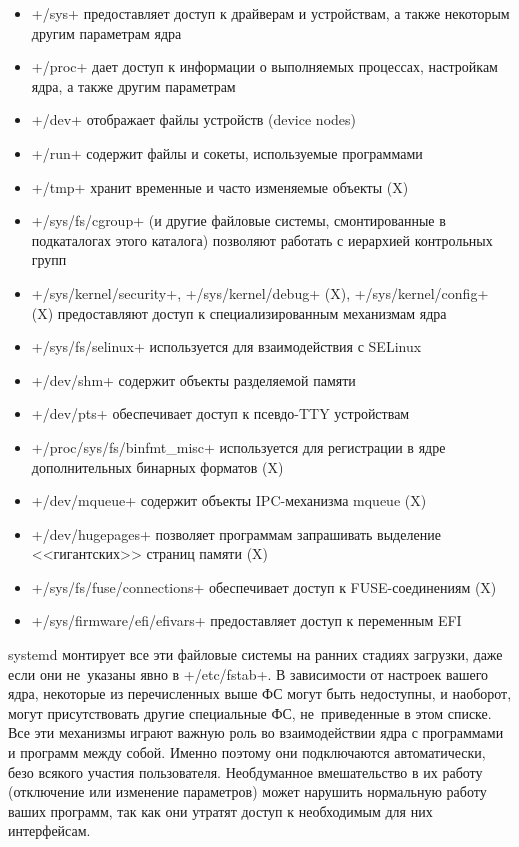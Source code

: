 \documentclass[10pt,oneside,a4paper]{article}
\begin{document}
\begin{itemize}
	\item +/sys+ предоставляет доступ к драйверам и устройствам, а также
		некоторым другим параметрам ядра
	\item +/proc+ дает доступ к информации о выполняемых процессах, 
		настройкам ядра, а также другим параметрам
	\item +/dev+ отображает файлы устройств (device nodes)
	\item +/run+ содержит файлы и сокеты, используемые программами
	\item +/tmp+ хранит временные и часто изменяемые объекты (X)
	\item +/sys/fs/cgroup+ (и другие файловые системы, смонтированные в
		подкаталогах этого каталога) позволяют работать с иерархией
		контрольных групп
	\item +/sys/kernel/security+, +/sys/kernel/debug+ (X),
		+/sys/kernel/config+ (X) предоставляют доступ к
		специализированным механизмам ядра
	\item +/sys/fs/selinux+ используется для взаимодействия с SELinux
	\item +/dev/shm+ содержит объекты разделяемой памяти
	\item +/dev/pts+ обеспечивает доступ к псевдо-TTY устройствам
	\item +/proc/sys/fs/binfmt_misc+ используется для регистрации в ядре
		дополнительных бинарных форматов (X)
	\item +/dev/mqueue+ содержит объекты IPC-механизма mqueue (X)
	\item +/dev/hugepages+ позволяет программам запрашивать выделение 
		<<гигантских>> страниц памяти (X)
	\item +/sys/fs/fuse/connections+ обеспечивает доступ к
		FUSE-соединениям (X)
	\item +/sys/firmware/efi/efivars+ предоставляет доступ к переменным EFI
\end{itemize}

systemd монтирует все эти файловые системы на ранних стадиях загрузки, даже если
они не~указаны явно в +/etc/fstab+. В зависимости от настроек вашего ядра,
некоторые из перечисленных выше ФС могут быть недоступны, и наоборот, могут
присутствовать другие специальные ФС, не~приведенные в этом списке. Все эти
механизмы играют важную роль во взаимодействии ядра с программами и программ
между собой. Именно поэтому они подключаются автоматически, безо всякого участия
пользователя. Необдуманное вмешательство в их работу (отключение или изменение
параметров) может нарушить нормальную работу ваших программ, так как они утратят
доступ к необходимым для них интерфейсам.
\end{document}
